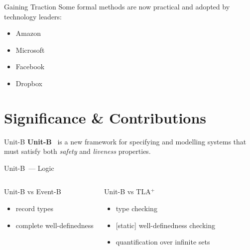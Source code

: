 \documentclass[10pt]{beamer}
\newcommand{\unitb}{Unit-B\xspace}
\newcommand{\eventb}{Event-B\xspace}
\newcommand{\tla}{TLA${}^+$\xspace}
\begin{document}
\begin{frame}[fragile]{Gaining Traction}
  Some formal methods are now practical and adopted by technology leaders:
  \begin{itemize}
  \item Amazon
  \item Microsoft
  \item Facebook
  \item Dropbox
  \end{itemize}
\end{frame}


\section{Significance \& Contributions}

\begin{frame}[fragile]{\unitb}
  \textbf{\unitb}~\cite{SoSyM/Hudon/Hoang/Ostroff15} is a new
  framework for specifying and modelling systems that must satisfy
  both \emph{safety} and \emph{liveness} properties.
\end{frame}

\begin{frame}[fragile]{\unitb\ --- Logic}
  \begin{columns}[T,onlytextwidth]
      \begin{block}{\unitb vs \eventb~\cite{DBLP:books/daglib/0024570}}
        \begin{itemize}
          \item record types
          \item complete well-definedness
      \end{itemize}
      \end{block}
      \pause


      \begin{block}{\unitb vs \tla~\cite{DBLP:books/aw/Lamport2002}}
        \begin{itemize}
          \item type checking
          \item {[static]} well-definedness checking
          \item quantification over infinite sets\footnotemark
        \end{itemize}
      \end{block}
  \end{columns}
\end{frame}
\end{document}
